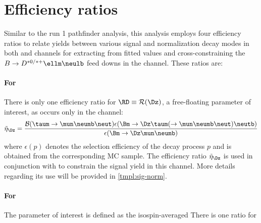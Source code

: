 \section{Efficiency ratios}
\label{ref:fit:eff}

Similar to the run 1 \RDX pathfinder analysis,
this analysis employs four efficiency ratios to relate yields between
various signal and normalization decay modes in both \Dz and \Dstar channels
for extracting \RDX from fitted values and cross-constraining the
$B \rightarrow D^{*0/*+}\ellm\neulb$ feed downs in the \Dz channel.
These ratios are:

\paragraph{For \RD}
There is only one efficiency ratio for $\RD \equiv \mathcal{R}(\Dz)$,
a free-floating parameter of interest,
as \RD occurs only in the \Dz channel:
\begin{equation}
    \tilde{\eta}_{\Dz} = \frac{
        \mathcal{B}(\taum \rightarrow \mun\neumb\neut)
        \epsilon{(\Bm \rightarrow \Dz \taum (\rightarrow \mun\neumb\neut) \neutb)}
    }{
        \epsilon({\Bm \rightarrow \Dz \mun \neumb})
    }
\end{equation}
where $\epsilon(p)$ denotes the selection efficiency of the decay process $p$
and is obtained from the corresponding MC sample.
The efficiency ratio
$\tilde{\eta}_{\Dz}$ is used in conjunction with \RD to constrain the signal
yield in this channel.
More details regarding its use will be provided in \cref{tmpl:sig-norm}.

\paragraph{For \RDst}
The parameter of interest \RDst is defined as the isospin-averaged
There is one ratio for
